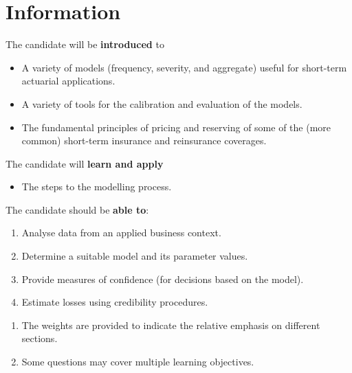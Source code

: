\section{Information}

\begin{distributions}[Statements]
The candidate will be \textbf{introduced} to
\begin{itemize}[leftmargin = *]
	\item	A variety of models (frequency, severity, and aggregate) useful for short-term actuarial applications.
	\item	A variety of tools for the calibration and evaluation of the models. 
	\item	The fundamental principles of pricing and reserving of some of the (more common) short-term insurance and reinsurance coverages.
\end{itemize}

The candidate will \textbf{learn and apply}
\begin{itemize}[leftmargin = *]
	\item	The steps to the modelling process.
\end{itemize}

The candidate should be \textbf{able to}:
\begin{enumerate}[leftmargin = *]
	\item	Analyse data from an applied business context.
	\item	Determine a suitable model and its parameter values.
	\item	Provide measures of confidence (for decisions based on the model).
	\item	Estimate losses using credibility procedures.
\end{enumerate}
\end{distributions}

\begin{outcomes}[Notes]
\begin{enumerate}[leftmargin = *]
	\item	The weights are provided to indicate the relative emphasis on different sections.
	\item	Some questions may cover multiple learning objectives.
\end{enumerate}
\end{outcomes}


